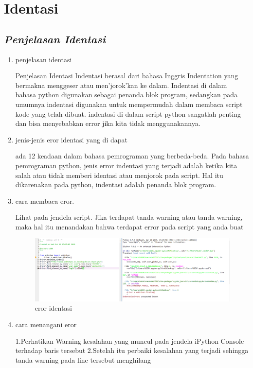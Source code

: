 \chapter*{Identasi}

\section*{\textit{ Penjelasan Identasi }}

\begin{enumerate}

\item penjelasan identasi
\par
Penjelasan Identasi Indentasi berasal dari bahasa Inggris Indentation yang  bermakna menggeser atau men'jorok'kan ke dalam. Indentasi di dalam bahasa  python digunakan sebagai penanda blok program, sedangkan pada umumnya  indentasi digunakan untuk mempermudah dalam membaca script kode yang telah dibuat.  indentasi di dalam script python sangatlah penting dan bisa menyebabkan error jika 
kita tidak menggunakannya.

\item jenis-jenis eror identasi yang di dapat
\par
ada 12 keadaan dalam bahasa pemrograman yang berbeda-beda. Pada bahasa pemrograman python, jenis error indentasi yang terjadi adalah ketika kita salah atau tidak memberi identasi atau menjorok pada script. Hal itu dikarenakan pada python, indentasi adalah penanda blok program.

\item cara membaca eror.
\par
Lihat pada jendela script. Jika terdapat tanda warning atau tanda warning,
maka hal itu menandakan bahwa terdapat error pada script yang anda
buat

\begin{figure}[h]
\includegraphics[scale=0.8]{figure/identasi1.png}
\center
\caption{eror identasi}
\end{figure}

\item cara menangani eror
\par
1.Perhatikan Warning kesalahan yang muncul pada jendela iPython Console
terhadap baris tersebut
2.Setelah itu perbaiki kesalahan yang terjadi sehingga tanda warning pada
line tersebut menghilang


\end{enumerate}
